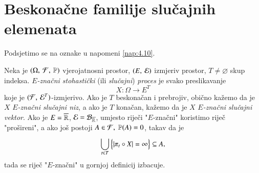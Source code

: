 
\chapter{Beskona\v cne familije slu\v cajnih elemenata} \label{poglavlje8}

Podsjetimo se na oznake u napomeni \ref{nap:4.10}.

\begin{defn}    \label{defn:8.1}
    Neka je $(\Omega, \: \mathcal{F}, \: \mathbb{P})$ vjerojatnosni prostor, $({E}, \: {\mathcal{E}})$ izmjeriv prostor, $T \neq \varnothing$ skup indeksa.
    \emph{$E$-zna\v cni stohasti\v cki} (ili \emph{slu\v cajni}) \emph{proces} je svako preslikavanje
    \begin{equation*}
        X : \Omega \to E^T
    \end{equation*}
    koje je $({\mathcal{F}}, \: {\mathcal{E}^T})$-izmjerivo.
    Ako je $T$ beskona\v can i prebrojiv, obi\v cno ka\v zemo da je $X$ \emph{$E$-zna\v cni slu\v cajni niz}, a ako je $T$ kona\v can, ka\v zemo da je $X$ \emph{$E$-zna\v cni slu\v cajni vektor}.
    Ako je $E = \overline{\mathbb{R}}$, $\mathcal{E} = \mathcal{B}_{\overline{\mathbb{R}}}$, umjesto rije\v ci "$E$-zna\v cni" koristimo rije\v c "pro\v sireni", a ako jo\v s postoji $A \in \mathcal{F}, \; \mathbb{P}({A}) = 0$, takav da je
    \begin{equation*}
        \bigcup\limits_{t \in T}^{} \Big\{ |\pi_t \circ X| = \infty \Big\} \subseteq A,
    \end{equation*}
    tada se rije\v c "$E$-zna\v cni" u gornjoj definicij izbacuje.
\end{defn}

